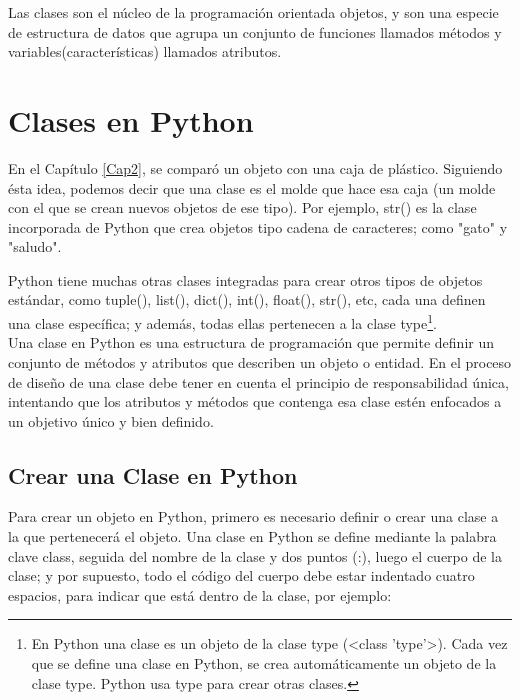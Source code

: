Las clases son el núcleo de la programación orientada objetos, y son una especie de estructura de datos que agrupa un conjunto de funciones llamados métodos y variables(características) llamados atributos.



\section{Clases en Python}\label{clases}


En el Capítulo \ref{Cap2}, se comparó un objeto con una caja de plástico. Siguiendo ésta idea,  podemos decir que una clase es el molde que hace esa caja (un molde con el que se crean nuevos objetos de ese tipo). Por ejemplo, {\ttfamily str()}  es la clase incorporada de Python que crea objetos tipo cadena de caracteres; como  {}"{}gato{}"{} y  {}"{}saludo{}"{}. 

Python tiene muchas otras clases integradas para crear otros tipos de objetos estándar, como  {\ttfamily tuple()},  {\ttfamily list()},  {\ttfamily dict()},  {\ttfamily int()}, {\ttfamily float()},  {\ttfamily str()}, etc, cada una definen una clase específica; y además, todas ellas pertenecen a la clase {\ttfamily type}\footnote{En Python una clase es un objeto de la clase  {\ttfamily type} ({\ttfamily {}<{}class {}'{}type{}'{}>{}}). Cada vez que se define una clase en Python, se crea automáticamente un objeto de la clase {\ttfamily type}.  Python usa {\ttfamily type} para crear otras clases.}. \\


Una clase en Python es una estructura de programación que permite definir un conjunto de métodos y atributos que describen un objeto o entidad. En el proceso de diseño de una clase debe tener en cuenta el principio de responsabilidad única, intentando que los atributos y métodos que contenga esa clase estén enfocados a un objetivo único y bien definido. 




\subsection{Crear una Clase en Python}

Para crear un objeto en Python, primero es necesario definir o crear una clase a la que pertenecerá el objeto.
Una clase en Python se define mediante la palabra clave  {\ttfamily class}, seguida del nombre de la clase y dos puntos (:), luego el cuerpo de la clase; y por supuesto, todo el código del cuerpo debe estar indentado cuatro espacios, para indicar que está dentro de la clase, por ejemplo:

